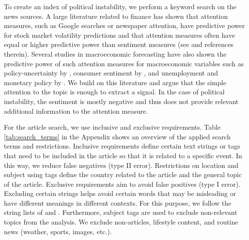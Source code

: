 \documentclass[12pt,a4paper,fleqn]{article}
\begin{document}
To create an index of political instability, we perform a keyword search on the news sources. A large literature related to finance has shown that attention measures, such as Google searches or newspaper attention, have predictive power for stock market volatility predictions and that attention measures often have equal or higher predictive power than sentiment measures (see \cite{AUDRINO2020} and references therein). Several studies in macroeconomic forecasting have also shown the predictive power of such attention measures for macroeconomic variables such as policy-uncertainty by \cite{baker2016}, consumer sentiment by \cite{doms2004}, and unemployment and monetary policy by \cite{fisher2022}. We build on this literature and argue that the simple attention to the topic is enough to extract a signal. In the case of political instability, the sentiment is mostly negative and thus does not provide relevant additional information to the attention measure. 


For the article search, we use inclusive and exclusive requirements. Table \ref{tab:search_terms} in the Appendix shows an overview of the applied search terms and restrictions. Inclusive requirements define certain text strings or tags that need to be included in the article so that it is related to a specific event. In this way, we reduce false negatives (type II error). Restrictions on location and subject using tags define the country related to the article and the general topic of the article. Exclusive requirements aim to avoid false positives (type I error). Excluding certain strings helps avoid certain words that may be misleading or have different meanings in different contexts. For this purpose, we follow the string lists of \cite{caldara2022} and \cite{BARRETT2022}. Furthermore, subject tags are used to exclude non-relevant topics from the analysis. We exclude non-articles, lifestyle content, and routine news (weather, sports, images, etc.). 
\end{document}
